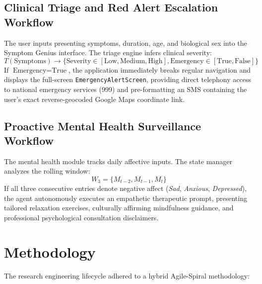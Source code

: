 \documentclass[12pt,a4paper,oneside]{report}
\begin{document}
\section{Clinical Triage and Red Alert Escalation Workflow}
The user inputs presenting symptoms, duration, age, and biological sex into the Symptom Genius interface. The triage engine infers clinical severity:
\begin{equation}
    T(\text{Symptoms}) \rightarrow \{\text{Severity} \in [\text{Low}, \text{Medium}, \text{High}], \text{Emergency} \in [\text{True}, \text{False}]\}
\end{equation}
If $\text{Emergency} = \text{True}$, the application immediately breaks regular navigation and displays the full-screen \texttt{EmergencyAlertScreen}, providing direct telephony access to national emergency services (999) and pre-formatting an SMS containing the user's exact reverse-geocoded Google Maps coordinate link.

\section{Proactive Mental Health Surveillance Workflow}
The mental health module tracks daily affective inputs. The state manager analyzes the rolling window:
\begin{equation}
    W_3 = \{M_{t-2}, M_{t-1}, M_t\}
\end{equation}
If all three consecutive entries denote negative affect (\textit{Sad}, \textit{Anxious}, \textit{Depressed}), the agent autonomously executes an empathetic therapeutic prompt, presenting tailored relaxation exercises, culturally affirming mindfulness guidance, and professional psychological consultation disclaimers.

\chapter{Methodology}

The research engineering lifecycle adhered to a hybrid Agile-Spiral methodology:
\end{document}
